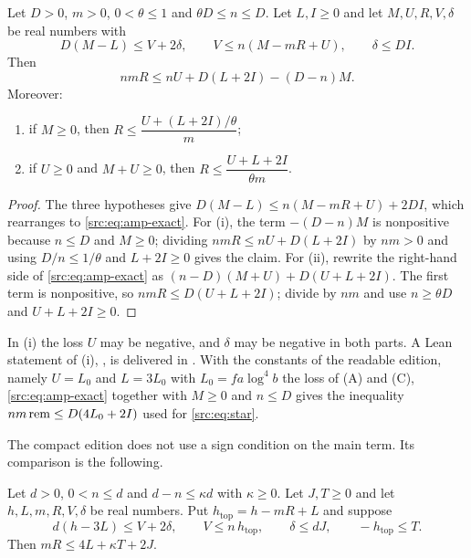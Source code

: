 \begin{proposition}\label{src:prop:amplification}
Let $D>0$, $m>0$, $0<\theta\le1$ and $\theta D\le n\le D$. Let $L,I\ge0$ and let
$M,U,R,V,\delta$ be real numbers with
\begin{equation}\label{src:eq:sandwich}
D(M-L)\le V+2\delta,\qquad V\le n(M-mR+U),\qquad \delta\le DI .
\end{equation}
Then
\begin{equation}\label{src:eq:amp-exact}
nmR\le nU+D(L+2I)-(D-n)M .
\end{equation}
Moreover:
\begin{enumerate}[label=\textup{(\roman*)}]
\item if $M\ge0$, then $R\le\dfrac{U+(L+2I)/\theta}{m}$;
\item if $U\ge0$ and $M+U\ge0$, then $R\le\dfrac{U+L+2I}{\theta m}$.
\end{enumerate}
\end{proposition}

\begin{proof}
The three hypotheses give $D(M-L)\le n(M-mR+U)+2DI$, which rearranges to
\eqref{src:eq:amp-exact}. For (i), the term $-(D-n)M$ is nonpositive because $n\le D$ and
$M\ge0$; dividing $nmR\le nU+D(L+2I)$ by $nm>0$ and using $D/n\le1/\theta$ and $L+2I\ge0$ gives
the claim. For (ii), rewrite the right-hand side of \eqref{src:eq:amp-exact} as
$(n-D)(M+U)+D(U+L+2I)$. The first term is nonpositive, so $nmR\le D(U+L+2I)$; divide by $nm$
and use $n\ge\theta D$ and $U+L+2I\ge0$.
\end{proof}

In (i) the loss $U$ may be negative, and $\delta$ may be negative in both parts. A Lean
statement of (i), , is delivered in
. With the constants of the
readable edition, namely $U=L_0$ and $L=3L_0$ with $L_0=fa\log^4b$ the loss of (A) and (C),
\eqref{src:eq:amp-exact} together with $M\ge0$ and $n\le D$ gives the inequality
$nm\,\mathrm{rem}\le D(4L_0+2I)$ used for \eqref{src:eq:star}.

The compact edition does not use a sign condition on the main term. Its comparison is the
following.

\begin{proposition}\label{src:prop:top}
Let $d>0$, $0<n\le d$ and $d-n\le\kappa d$ with $\kappa\ge0$. Let $J,T\ge0$ and let
$h,L,m,R,V,\delta$ be real numbers. Put $h_{\mathrm{top}}=h-mR+L$ and suppose
\[
d(h-3L)\le V+2\delta,\qquad V\le n\,h_{\mathrm{top}},\qquad \delta\le dJ,\qquad
-h_{\mathrm{top}}\le T .
\]
Then $mR\le4L+\kappa T+2J$.
\end{proposition}

